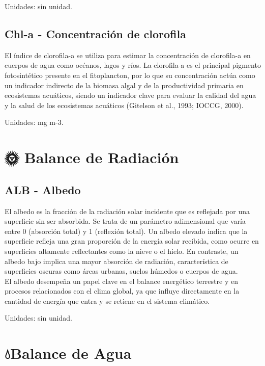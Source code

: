 \documentclass[
]{book}
\begin{document}
Unidades: sin unidad.

\subsection{\texorpdfstring{\textbf{Chl-a} - Concentración de clorofila}{Chl-a - Concentración de clorofila}}\label{chl-a---concentraciuxf3n-de-clorofila}

El índice de clorofila-a se utiliza para estimar la concentración de clorofila-a en cuerpos de agua como océanos, lagos y ríos. La clorofila-a es el principal pigmento fotosintético presente en el fitoplancton, por lo que su concentración actúa como un indicador indirecto de la biomasa algal y de la productividad primaria en ecosistemas acuáticos, siendo un indicador clave para evaluar la calidad del agua y la salud de los ecosistemas acuáticos (Gitelson et al., 1993; IOCCG, 2000).

Unidades: mg m-3.

\section{\texorpdfstring{\textbf{🌞 Balance de Radiación}}{🌞 Balance de Radiación}}\label{balance-de-radiaciuxf3n}

\subsection{\texorpdfstring{\textbf{ALB} - Albedo}{ALB - Albedo}}\label{alb---albedo}

El albedo es la fracción de la radiación solar incidente que es reflejada por una superficie sin ser absorbida. Se trata de un parámetro adimensional que varía entre 0 (absorción total) y 1 (reflexión total). Un albedo elevado indica que la superficie refleja una gran proporción de la energía solar recibida, como ocurre en superficies altamente reflectantes como la nieve o el hielo. En contraste, un albedo bajo implica una mayor absorción de radiación, característica de superficies oscuras como áreas urbanas, suelos húmedos o cuerpos de agua.\\
El albedo desempeña un papel clave en el balance energético terrestre y en procesos relacionados con el clima global, ya que influye directamente en la cantidad de energía que entra y se retiene en el sistema climático.

Unidades: sin unidad.

\section{\texorpdfstring{\textbf{💧Balance de Agua}}{💧Balance de Agua}}\label{balance-de-agua}
\end{document}
